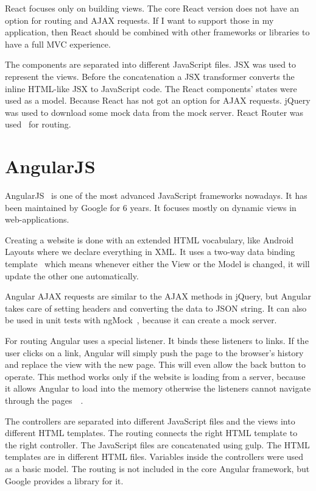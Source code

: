 React focuses only on building views. The core React version does not have an option for routing and AJAX requests. If I want to support those in my application, then React should be combined with other frameworks or libraries to have a full MVC experience.

The components are separated into different JavaScript files. JSX was used to represent the views. Before the concatenation a JSX transformer converts the inline HTML-like JSX to JavaScript code. The React components' states were used as a model. Because React has not got an option for AJAX requests. jQuery was used to download some mock data from the mock server. React Router was used~\cite{React-router} for routing. 

\section{AngularJS}

AngularJS~\cite{Angular} is one of the most advanced JavaScript frameworks nowadays.  It has been maintained by Google for 6 years. It focuses mostly on dynamic views in web-applications. 

Creating a website is done with an extended HTML vocabulary, like Android Layouts where we declare everything in XML.  It uses a two-way data binding template~\cite{Angular-Developer-DataBinding} which means whenever either the View or the Model is changed, it will update the other one automatically.

Angular AJAX requests are similar to the AJAX methods in jQuery, but Angular takes care of setting headers and converting the data to JSON string. It can also be used in unit tests with ngMock~\cite{Angular-AJAX}, because it can create a mock server. 

For routing Angular uses a special listener. It binds these listeners to links. If the user clicks on a link, Angular will simply push the page to the browser's history and replace the view with the new page. This will even allow the back button to operate. This method works only if the website is loading from a server, because it allows Angular to load into the memory otherwise the listeners cannot navigate through the pages~\cite{Angular-Location}~\cite{Angular-Location2}.

The controllers are separated into different JavaScript files and the views into different HTML templates. The routing connects the right HTML template to the right controller. The JavaScript files are concatenated using gulp. The HTML templates are in different HTML files. Variables inside the controllers were used as a basic model. The routing is not included in the core Angular framework, but Google provides a library for it.

